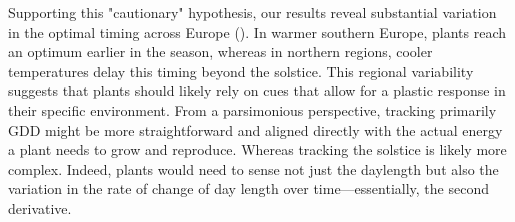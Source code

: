 \documentclass[11pt,letter]{article}
\begin{document}
Supporting this "cautionary" hypothesis, our results reveal substantial variation in the optimal timing across Europe (). In warmer southern Europe, plants reach an optimum earlier in the season, whereas in northern regions, cooler temperatures delay this timing beyond the solstice. 
This regional variability suggests that plants should likely 
rely on cues that allow for a plastic response in their specific environment. 
From a parsimonious perspective, tracking primarily GDD might be more straightforward and aligned directly with the actual energy a plant needs to grow and reproduce. %
Whereas tracking the solstice is likely more complex. Indeed, plants would need to sense not just the daylength but also the variation in the rate of change of day length over time---essentially, the second derivative.

\end{document}
